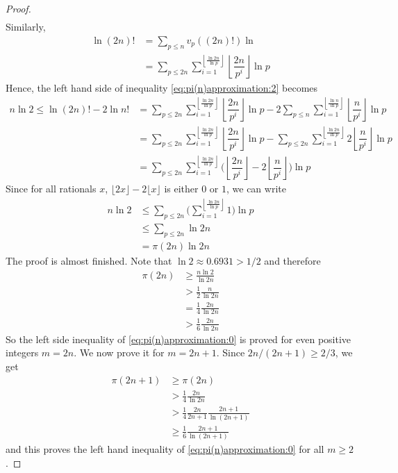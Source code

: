 \begin{proof}
\begin{align*}
			\end{align*}
		Similarly,
			\begin{align*}
				\ln (2n)!
					& = \sum_{p \leq n} v_p\left((2n)!\right) \ln \\
					& = \sum_{p \leq 2n}  \sum_{i=1}^{\left\lfloor \frac{\ln 2n}{\ln p}\right\rfloor}\left\lfloor\dfrac{2n}{p^i}\right\rfloor \ln p
			\end{align*}
		Hence, the left hand side of inequality \eqref{eq:pi(n)approximation:2} becomes
			\begin{align}
				n \ln 2 \leq \ln (2n)! - 2 \ln n!
					& = \sum_{p \leq 2n}  \sum_{i=1}^{\left\lfloor \frac{\ln 2n}{\ln p}\right\rfloor}\left\lfloor\dfrac{2n}{p^i}\right\rfloor \ln p - 2  \sum_{p \leq n} \sum_{i=1}^{\left\lfloor \frac{\ln n}{\ln p}\right\rfloor} \left\lfloor\dfrac{n}{p^i}\right\rfloor \ln p \nonumber\\
					& = \sum_{p \leq 2n}  \sum_{i=1}^{\left\lfloor \frac{\ln 2n}{\ln p}\right\rfloor}\left\lfloor\dfrac{2n}{p^i}\right\rfloor \ln p -  \sum_{p \leq 2n} \sum_{i=1}^{\left\lfloor \frac{\ln 2n}{\ln p}\right\rfloor} 2 \left\lfloor\dfrac{n}{p^i}\right\rfloor \ln p \nonumber\\
					& = \sum_{p \leq 2n}  \sum_{i=1}^{\left\lfloor \frac{\ln 2n}{\ln p}\right\rfloor} \Bigg(\left\lfloor\dfrac{2n}{p^i}\right\rfloor - 2 \left\lfloor\dfrac{n}{p^i}\right\rfloor\Bigg) \ln p \label{eq:pi(n)approximation:4}
			\end{align}
		Since for all rationals $x$, $\lfloor2x\rfloor-2\lfloor x\rfloor$ is either $0$ or $1$, we can write
			\begin{align*}
			n \ln 2 &\leq \sum_{p \leq 2n}  \Bigg(\sum_{i=1}^{\left\lfloor \frac{\ln 2n}{\ln p}\right\rfloor} 1\Bigg) \ln p\\
					&\leq \sum_{p \leq 2n} \ln 2n\\
					&=\pi(2n)\ln 2n
			\end{align*}
		The proof is almost finished. Note that $\ln 2 \approx 0.6931 > 1/2$ and therefore
			\begin{align*}
				\pi(2n)
					& \geq \frac{n \ln 2}{\ln 2n}\\
					& > \frac{1}{2}\frac{n}{\ln 2n}\\
					& = \frac{1}{4}\frac{2n}{\ln 2n}\\
					& > \frac{1}{6}\frac{2n}{\ln 2n}
			\end{align*}
		So the left side inequality of \eqref{eq:pi(n)approximation:0} is proved for even positive integers $m=2n$. We now prove it for $m=2n+1$. Since $2n/(2n+1)\geq 2/3$, we get
			\begin{align*}
				\pi(2n+1)
					& \geq \pi(2n)\\
					& > \frac{1}{4}\frac{2n}{\ln 2n}\\
					& > \frac{1}{4} \frac{2n}{2n+1}\frac{2n+1}{\ln (2n+1)}\\
					& \geq \frac{1}{6}\frac{2n+1}{\ln (2n+1)}
			\end{align*}
		and this proves the left hand inequality of \eqref{eq:pi(n)approximation:0} for all $m \geq 2$.


\end{proof}
